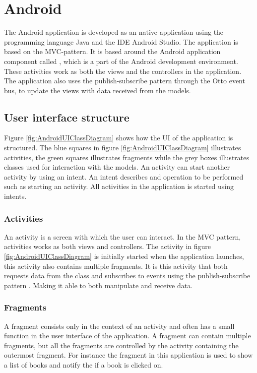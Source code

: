 \section{Android}
\label{architecture-android}
The Android application is developed as an native application using the programming language Java and the \gls{IDE} Android Studio.\cite{android-studios} The application is based on the \gls{MVC}-pattern. It is based around the Android application component called , which is a part of the Android development environment. These activities work as both the views and the controllers in the application. The application also uses the publish-subscribe pattern \cite[p. 226-229]{progark} through the Otto event bus, to update the views with data received from the models. \cite{otto}

\subsection{User interface structure}
Figure \ref{fig:AndroidUIClassDiagram} shows how the \gls{UI} of the application is structured. The blue squares in figure \ref{fig:AndroidUIClassDiagram} illustrates activities, the green squares illustrates fragments while the grey boxes illustrates classes used for interaction with the models. An activity can start another activity by using an intent.\cite{android-intent} An intent describes and operation to be performed such as starting an activity. All activities in the application is started using intents. 

\subsubsection{Activities}
    An activity is a screen with which the user can interact.\cite{android-activity} In the \gls{MVC} pattern, activities works as both views and controllers. The  activity in figure \ref{fig:AndroidUIClassDiagram} is initially started when the application launches, this activity also contains multiple fragments. It is this activity that both requests data from the  class and subscribes to events using the publish-subscribe pattern \cite[p. 226-229]{progark}. Making it able to both manipulate and receive data.
    
\subsubsection{Fragments}
    A fragment consists only in the context of an activity and often has a small function in the user interface of the application.\cite{android-fragment} A fragment can contain multiple fragments, but all the fragments are controlled by the activity containing the outermost fragment. For instance the fragment  in this application is used to show a list of books and notify the  if a book is clicked on. 

